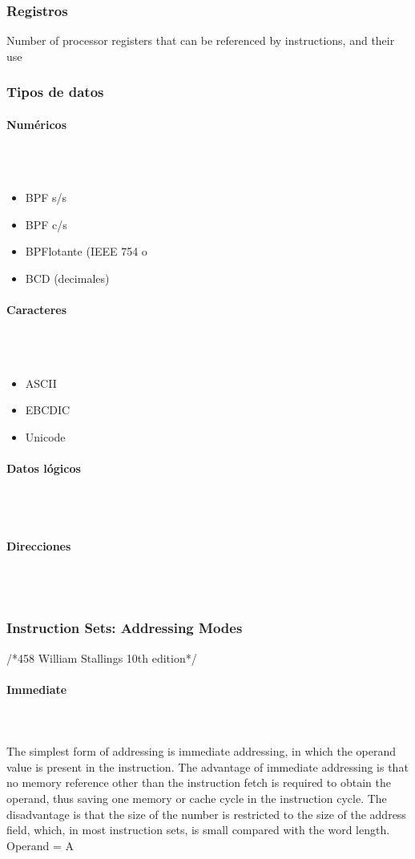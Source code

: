 \subsubsection{Registros}
Number of processor registers that can be referenced by instructions, and their use


\subsubsection{Tipos de datos}
\paragraph{Numéricos}\mbox{}\\\\%
\begin{itemize}
\item BPF s/s
\item BPF c/s
\item BPFlotante (IEEE 754 o
\item BCD (decimales)
\end{itemize}
\paragraph{Caracteres}\mbox{}\\\\%
\begin{itemize}
\item ASCII
\item EBCDIC
\item Unicode
\end{itemize}
\paragraph{Datos lógicos}\mbox{}\\\\%
\paragraph{Direcciones}\mbox{}\\\\%


\subsubsection{Instruction Sets: Addressing Modes}
/*458 William Stallings 10th edition*/

\paragraph{Immediate}\mbox{}\\\\%
The simplest form of addressing is immediate addressing, in which the operand value is present in the instruction. The advantage of immediate addressing is that no memory reference other than the instruction fetch is required to obtain the operand, thus saving one memory or cache cycle in the instruction cycle. The disadvantage is that the size of the number is restricted to the size of the address field, which, in most instruction sets,
is small compared with the word length.
Operand = A

